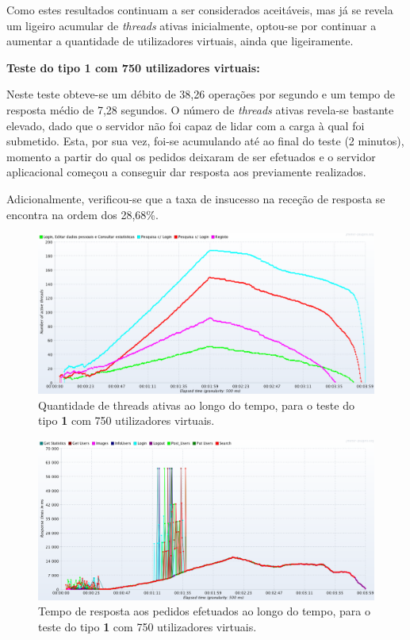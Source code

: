 Como estes resultados continuam a ser considerados aceitáveis, mas já se revela um ligeiro acumular de \textit{threads} ativas inicialmente, optou-se por continuar a aumentar a quantidade de utilizadores virtuais, ainda que ligeiramente.

\vspace{0.5cm}
\noindent\textbf{Teste do tipo 1 com 750 utilizadores virtuais:}

Neste teste obteve-se um débito de 38,26 operações por segundo e um tempo de resposta médio de 7,28 segundos. O número de \textit{threads} ativas revela-se bastante elevado, dado que o servidor não foi capaz de lidar com a carga à qual foi submetido. Esta, por sua vez, foi-se acumulando até ao final do teste (2 minutos), momento a partir do qual os pedidos deixaram de ser efetuados e o servidor aplicacional começou a conseguir dar resposta aos previamente realizados. 

Adicionalmente, verificou-se que a taxa de insucesso na receção de resposta se encontra na ordem dos 28,68\%. 


\begin{figure}[H]
    \centering
    \includegraphics[width=1\textwidth]{images/Testes/3PC_750T.png}
    \caption{Quantidade de threads ativas ao longo do tempo, para o teste do tipo \textbf{1} com 750 utilizadores virtuais.}
    \label{fig:3PC_100_threads}
\end{figure}

\begin{figure}[H]
    \centering
    \includegraphics[width=1\textwidth]{images/Testes/3PC_750R.png}
    \caption{Tempo de resposta aos pedidos efetuados ao longo do tempo, para o teste do tipo \textbf{1} com 750 utilizadores virtuais.}
    \label{fig:3PC_100_response}
\end{figure}

